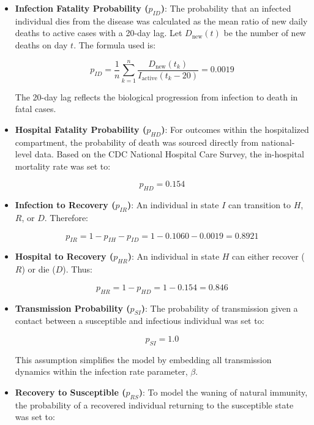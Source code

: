 \documentclass[11pt]{article}
\begin{document}
\begin{itemize}
    \[
    p_{IH} = \frac{1}{n} \sum_{k=1}^{n} \frac{H(t_k)}{I_{\text{active}}(t_k - 14)} = 0.1060
    \]

    The 14-day lag accounts for the typical period from infection to the development of severe symptoms.

    \item \textbf{Infection Fatality Probability ($p_{ID}$)}: The probability that an infected individual dies from the disease was calculated as the mean ratio of new daily deaths to active cases with a 20-day lag. Let $D_{\text{new}}(t)$ be the number of new deaths on day $t$. The formula used is:

    \[
    p_{ID} = \frac{1}{n} \sum_{k=1}^{n} \frac{D_{\text{new}}(t_k)}{I_{\text{active}}(t_k - 20)} = 0.0019
    \]

    The 20-day lag reflects the biological progression from infection to death in fatal cases.

    \item \textbf{Hospital Fatality Probability ($p_{HD}$)}: For outcomes within the hospitalized compartment, the probability of death was sourced directly from national-level data. Based on the CDC National Hospital Care Survey\cite{cdc_hospital_mortality}, the in-hospital mortality rate was set to:

    \[
    p_{HD} = 0.154
    \]

    \item \textbf{Infection to Recovery ($p_{IR}$)}: An individual in state $I$ can transition to $H$, $R$, or $D$. Therefore:

    \[
    p_{IR} = 1 - p_{IH} - p_{ID} = 1 - 0.1060 - 0.0019 = 0.8921
    \]

    \item \textbf{Hospital to Recovery ($p_{HR}$)}: An individual in state $H$ can either recover ($R$) or die ($D$). Thus:

    \[
    p_{HR} = 1 - p_{HD} = 1 - 0.154 = 0.846
    \]

    \item \textbf{Transmission Probability ($p_{SI}$)}: The probability of transmission given a contact between a susceptible and infectious individual was set to:

    \[
    p_{SI} = 1.0
    \]

    This assumption simplifies the model by embedding all transmission dynamics within the infection rate parameter, $\beta$.

    \item \textbf{Recovery to Susceptible ($p_{RS}$)}: To model the waning of natural immunity, the probability of a recovered individual returning to the susceptible state was set to:


\end{itemize}
\end{document}
